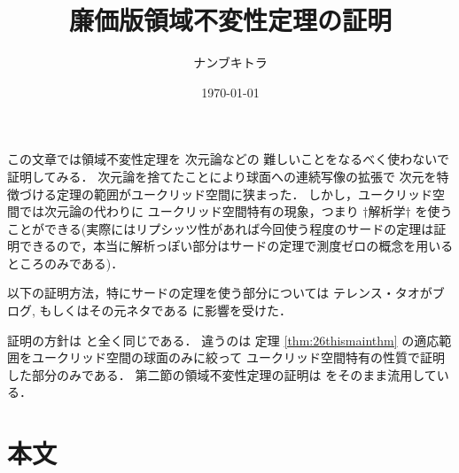 \documentclass[leqno, a4paper, 12pt]{jsarticle}
\title{
廉価版領域不変性定理の証明
}
\author{ナンブキトラ}
\date{\today}
\begin{document}
\maketitle

この文章では領域不変性定理を
次元論などの
難しいことをなるべく使わないで証明してみる．
次元論を捨てたことにより球面への連続写像の拡張で
次元を特徴づける定理の範囲がユークリッド空間に狭まった．
しかし，ユークリッド空間では次元論の代わりに
ユークリッド空間特有の現象，つまり
$\dagger$解析学$\dagger$
を使うことができる(実際にはリプシッツ性があれば今回使う程度のサードの定理は証明できるので，本当に解析っぽい部分はサードの定理で測度ゼロの概念を用いるところのみである)．


以下の証明方法，特にサードの定理を使う部分については
テレンス・タオ\cite{tao}がブログ, 
もしくはその元ネタである
\cite{Kul}
に影響を受けた．

証明の方針は
\cite{dempa3}
と全く同じである．
違うのは
定理
\ref{thm:26thismainthm}
の適応範囲をユークリッド空間の球面のみに絞って
ユークリッド空間特有の性質で証明した部分のみである．
第二節の領域不変性定理の証明は
\cite{dempa3}
をそのまま流用している．

\section{本文}
\end{document}
